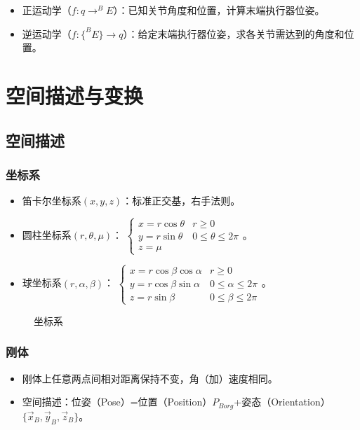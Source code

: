 \documentclass[
12pt, %
a4paper, 
oneside, %
headinclude,footinclude, %
]{scrartcl}
\begin{document}
\begin{itemize}
\item 正运动学（$ f:q \rightarrow ^B E $）：已知关节角度和位置，计算末端执行器位姿。
\item 逆运动学（$ f:\{^B E\} \rightarrow q $）：给定末端执行器位姿，求各关节需达到的角度和位置。
\end{itemize}
\section{空间描述与变换}
\subsection[空间描述]{空间描述}
\subsubsection[坐标系]{坐标系}
\begin{itemize}
\item 笛卡尔坐标系$ (x, y, z) $：标准正交基，右手法则。
\item 圆柱坐标系$ (r, \theta, \mu) $：
$ 
\begin{cases}
x = r\cos\theta &r \geq 0 \\
y = r\sin\theta &0 \leq \theta \leq 2 \pi \\
z = \mu
\end{cases} 
$。
\item 球坐标系$ (r, \alpha, \beta) $：
$ 
\begin{cases}
x = r\cos\beta\cos\alpha &r \geq 0 \\
y = r\cos\beta\sin\alpha &0 \leq \alpha \leq 2\pi \\
z = r\sin\beta &0 \leq \beta \leq 2\pi
\end{cases} 
$。
\end{itemize}

\begin{figure}[H]
\centering
{} \quad
{} \quad
{}
\caption[坐标系]{坐标系}
\end{figure}
\subsubsection[刚体]{刚体}
\begin{itemize}
\item 刚体上任意两点间相对距离保持不变，角（加）速度相同。
\item 空间描述：位姿（Pose）=位置（Position）$ P_{Borg} $+姿态（Orientation）$ \{\vec x_B, \vec y_B, \vec z_B\} $。
\end{itemize}
\end{document}
